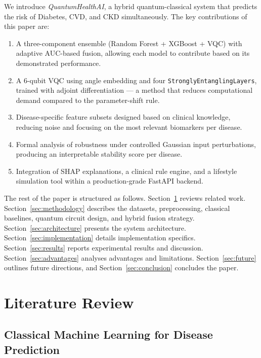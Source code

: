 ﻿\documentclass[conference]{IEEEtran}
\begin{document}
We introduce \textit{QuantumHealthAI}, a hybrid quantum-classical system that predicts
the risk of Diabetes, CVD, and CKD simultaneously. The key contributions of this paper
are:

\begin{enumerate}
    \item A three-component ensemble (Random Forest + XGBoost + VQC) with adaptive
          AUC-based fusion, allowing each model to contribute based on its demonstrated
          performance.
    \item A 6-qubit VQC using angle embedding and four \texttt{StronglyEntanglingLayers},
          trained with adjoint differentiation --- a method that reduces computational
          demand compared to the parameter-shift rule.
    \item Disease-specific feature subsets designed based on clinical knowledge, reducing
          noise and focusing on the most relevant biomarkers per disease.
    \item Formal analysis of robustness under controlled Gaussian input perturbations,
          producing an interpretable stability score per disease.
    \item Integration of SHAP explanations, a clinical rule engine, and a lifestyle
          simulation tool within a production-grade FastAPI backend.
\end{enumerate}

The rest of the paper is structured as follows. Section~\ref{sec:litreview} reviews
related work. Section~\ref{sec:methodology} describes the datasets, preprocessing,
classical baselines, quantum circuit design, and hybrid fusion strategy.
Section~\ref{sec:architecture} presents the system architecture.
Section~\ref{sec:implementation} details implementation specifics.
Section~\ref{sec:results} reports experimental results and discussion.
Section~\ref{sec:advantages} analyses advantages and limitations.
Section~\ref{sec:future} outlines future directions, and Section~\ref{sec:conclusion}
concludes the paper.

\section{Literature Review}
\label{sec:litreview}

\subsection{Classical Machine Learning for Disease Prediction}
\end{document}

